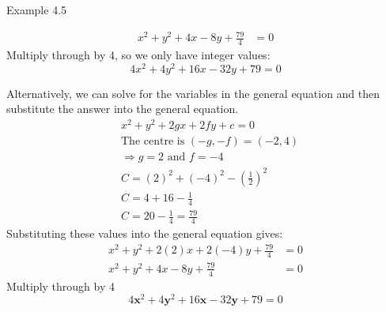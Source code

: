 \begin{example}{Example 4.5}
\begin{enumerate}
\begin{align*}
  x^2 + y^2 + 4x - 8y + \frac{79}{4} &= 0
  \end{align*}
  Multiply through by 4, so we only have integer values:
  \[ 4x^2 + 4y^2 + 16x - 32y + 79 = 0 \]
\end{enumerate}
Alternatively, we can solve for the variables in the general equation and then
substitute the answer into the general equation.
\begin{align*}
&x^2 + y^2 + 2gx + 2fy + c = 0 \\
&\text{The centre is } (-g, -f) = (-2, 4) \\
&\Longrightarrow g = 2 \text{ and } f = -4 \\
&C = (2)^2 + (-4)^2 - \left(\frac{1}{2}\right)^2 \\
&C = 4 + 16 - \frac{1}{4} \\
&C = 20 - \frac{1}{4} = \frac{79}{4}
\end{align*}
Substituting these values into the general equation gives:
\begin{align*}
x^2 + y^2 + 2(2)x + 2(-4)y + \frac{79}{4} &= 0 \\
x^2 + y^2 + 4x - 8y + \frac{79}{4} &= 0
\end{align*}
Multiply through by 4
\[ 4\boldsymbol{x}^2 + 4\boldsymbol{y}^2 + 16\boldsymbol{x} - 32\boldsymbol{y} + 79 = 0 \]
\end{example}

